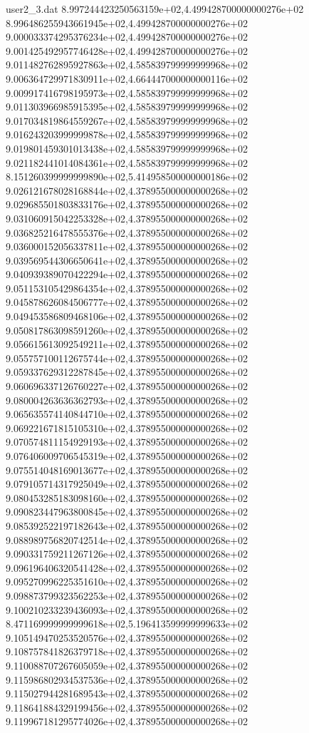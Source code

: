 \begin{filecontents}{user2_3.dat}
8.997244423250563159e+02,4.499428700000000276e+02
8.996486255943661945e+02,4.499428700000000276e+02
9.000033374295376234e+02,4.499428700000000276e+02
9.001425492957746428e+02,4.499428700000000276e+02
9.011482762895927863e+02,4.585839799999999968e+02
9.006364729971830911e+02,4.664447000000000116e+02
9.009917416798195973e+02,4.585839799999999968e+02
9.011303966985915395e+02,4.585839799999999968e+02
9.017034819864559267e+02,4.585839799999999968e+02
9.016243203999999878e+02,4.585839799999999968e+02
9.019801459301013438e+02,4.585839799999999968e+02
9.021182441014084361e+02,4.585839799999999968e+02
8.151260399999999890e+02,5.414958500000000186e+02
9.026121678028168844e+02,4.378955000000000268e+02
9.029685501803833176e+02,4.378955000000000268e+02
9.031060915042253328e+02,4.378955000000000268e+02
9.036825216478555376e+02,4.378955000000000268e+02
9.036000152056337811e+02,4.378955000000000268e+02
9.039569544306650641e+02,4.378955000000000268e+02
9.040939389070422294e+02,4.378955000000000268e+02
9.051153105429864354e+02,4.378955000000000268e+02
9.045878626084506777e+02,4.378955000000000268e+02
9.049453586809468106e+02,4.378955000000000268e+02
9.050817863098591260e+02,4.378955000000000268e+02
9.056615613092549211e+02,4.378955000000000268e+02
9.055757100112675744e+02,4.378955000000000268e+02
9.059337629312287845e+02,4.378955000000000268e+02
9.060696337126760227e+02,4.378955000000000268e+02
9.080004263636362793e+02,4.378955000000000268e+02
9.065635574140844710e+02,4.378955000000000268e+02
9.069221671815105310e+02,4.378955000000000268e+02
9.070574811154929193e+02,4.378955000000000268e+02
9.076406009706545319e+02,4.378955000000000268e+02
9.075514048169013677e+02,4.378955000000000268e+02
9.079105714317925049e+02,4.378955000000000268e+02
9.080453285183098160e+02,4.378955000000000268e+02
9.090823447963800845e+02,4.378955000000000268e+02
9.085392522197182643e+02,4.378955000000000268e+02
9.088989756820742514e+02,4.378955000000000268e+02
9.090331759211267126e+02,4.378955000000000268e+02
9.096196406320541428e+02,4.378955000000000268e+02
9.095270996225351610e+02,4.378955000000000268e+02
9.098873799323562253e+02,4.378955000000000268e+02
9.100210233239436093e+02,4.378955000000000268e+02
8.471169999999999618e+02,5.196413599999999633e+02
9.105149470253520576e+02,4.378955000000000268e+02
9.108757841826379718e+02,4.378955000000000268e+02
9.110088707267605059e+02,4.378955000000000268e+02
9.115986802934537536e+02,4.378955000000000268e+02
9.115027944281689543e+02,4.378955000000000268e+02
9.118641884329199456e+02,4.378955000000000268e+02
9.119967181295774026e+02,4.378955000000000268e+02

\end{filecontents}
